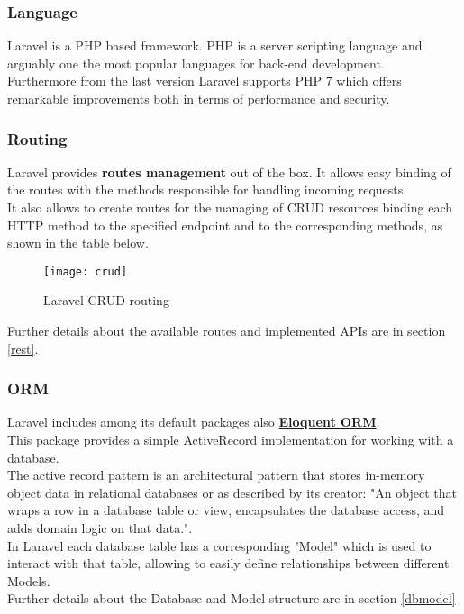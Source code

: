 \subsubsection*{Language}
Laravel is a PHP based framework. PHP is a server scripting language and arguably one the most popular languages for back-end development.\\
Furthermore from the last version Laravel supports PHP 7 which offers remarkable improvements both in terms of performance and security.

\subsubsection*{Routing}
Laravel provides \textbf{routes management} out of the box.
It allows easy binding of the routes with the methods responsible for handling incoming requests.\\
It also allows to create routes for the managing of CRUD resources binding each HTTP method to the specified endpoint and to the corresponding methods, as shown in the table below.
\begin{figure}[H]
	\centering
	\texttt{[image: crud]}
	\caption{Laravel CRUD routing}
\end{figure}
\noindent Further details about the available routes and implemented APIs are in section \ref{rest}.

\subsubsection*{ORM}
Laravel includes among its default packages also \href{https://laravel.com/docs/5.5/eloquent}{\textbf{Eloquent ORM}}.\\
This package provides a simple ActiveRecord implementation for working with a database.\\
The active record pattern is an architectural pattern that stores in-memory object data in relational databases or as described by its creator: "An object that wraps a row in a database table or view, encapsulates the database access, and adds domain logic on that data.".\\
In Laravel each database table has a corresponding "Model" which is used to interact with that table, allowing to easily define relationships between different Models.\\
Further details about the Database and Model structure are in section \ref{dbmodel}


